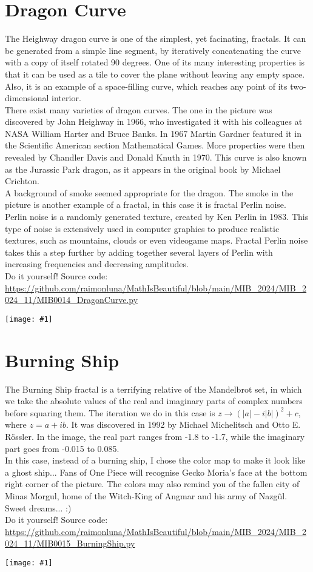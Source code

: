 \documentclass[12pt,landscape]{article}
\newcommand{\artpage}[3][]{%
  \begin{minipage}[t]{0.48\linewidth}
    \vspace{0pt} %
    \section*{#2} %
    \addcontentsline{toc}{section}{#2} %
    #3 %
  \end{minipage}%
  \hfill
  \begin{minipage}[t]{0.48\linewidth}
    \vspace{0pt} %
    \centering
    \texttt{[image: \#1]}
  \end{minipage}%
  \newpage
}
\begin{document}
\artpage[../Output/LowQuality/MIB0014_DragonCurve.png]{Dragon Curve}{%
The Heighway dragon curve is one of the simplest, yet facinating, fractals. It can be generated from a simple line segment, by iteratively concatenating the curve with a copy of itself rotated 90 degrees. One of its many interesting properties is that it can be used as a tile to cover the plane without leaving any empty space. Also, it is an example of a space-filling curve, which reaches any point of its two-dimensional interior.\\

There exist many varieties of dragon curves. The one in the picture was discovered by John Heighway in 1966, who investigated it with his colleagues at NASA William Harter and Bruce Banks. In 1967 Martin Gardner featured it in the Scientific American section Mathematical Games. More properties were then revealed by Chandler Davis and Donald Knuth in 1970. This curve is also known as the Jurassic Park dragon, as it appears in the original book by Michael Crichton.\\

A background of smoke seemed appropriate for the dragon. The smoke in the picture is another example of a fractal, in this case it is fractal Perlin noise. Perlin noise is a randomly generated texture, created by Ken Perlin in 1983. This type of noise is extensively used in computer graphics to produce realistic textures, such as mountains, clouds or even videogame maps. Fractal Perlin noise takes this a step further by adding together several layers of Perlin with increasing frequencies and decreasing amplitudes.\\

Do it yourself! Source code: \url{https://github.com/raimonluna/MathIsBeautiful/blob/main/MIB_2024/MIB_2024_11/MIB0014_DragonCurve.py}
}

\artpage[../Output/LowQuality/MIB0015_BurningShip.png]{Burning Ship}{%
The Burning Ship fractal is a terrifying relative of the Mandelbrot set, in which we take the absolute values of the real and imaginary parts of complex numbers before squaring them. The iteration we do in this case is $z \to (|a| - i|b|)^2 + c$, where $z = a + ib$. It was discovered in 1992 by Michael Michelitsch and Otto E. Rössler. In the image, the real part ranges from -1.8 to -1.7, while the imaginary part goes from -0.015 to 0.085.\\

In this case, instead of a burning ship, I chose the color map to make it look like a ghost ship... Fans of One Piece will recognise Gecko Moria's face at the bottom right corner of the picture. The colors may also remind you of the fallen city of Minas Morgul, home of the Witch-King of Angmar and his army of Nazgûl. Sweet dreams... :)\\

Do it yourself! Source code: \url{https://github.com/raimonluna/MathIsBeautiful/blob/main/MIB_2024/MIB_2024_11/MIB0015_BurningShip.py}
}
\end{document}
